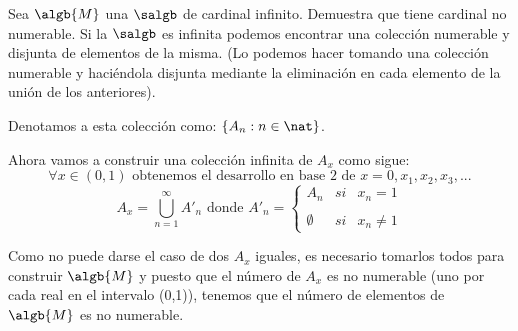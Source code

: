 \begin{problem}[10]
Sea $\algb{M}$ una $\salgb$ de cardinal infinito. Demuestra que tiene cardinal no numerable.
\solution
Si la $\salgb$ es infinita podemos encontrar una colección numerable y disjunta de elementos de la misma. (Lo podemos hacer tomando una colección numerable y haciéndola disjunta mediante la eliminación en cada elemento de la unión de los anteriores).

Denotamos a esta colección como: $\{A_n:n\in \nat\}$.

Ahora vamos a construir una colección infinita de $A_x$ como sigue:
\[\forall x \in (0,1) \text{ obtenemos el desarrollo en base 2 de } x=0,x_1,x_2,x_3,...\]
\[A_x=\bigcup_{n=1}^{\infty}A'_n \text{ donde } A'_n=\left\{ \begin{array}{lcc}
             A_n &   si  & x_n = 1 \\
             \\ \emptyset &  si  & x_n \neq 1
             \end{array}
   \right.\]

Como no puede darse el caso de dos $A_x$ iguales, es necesario tomarlos todos para construir $\algb{M}$ y puesto que el número de $A_x$ es no numerable (uno por cada real en el intervalo (0,1)), tenemos que el número de elementos de $\algb{M}$ es no numerable.

\end{problem}

